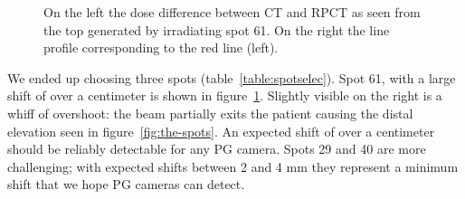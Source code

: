 \documentclass[a4paper,english]{article}
\begin{document}
\begin{figure}[htp]
  \captionsetup[subfigure]{labelformat=empty}
  \centering
  \quad\quad\quad
  \caption{On the left the dose difference between CT and RPCT as seen from the top generated by irradiating spot 61. On the right the line profile corresponding to the red line (left).}
  \label{fig:spot61}
\end{figure}

We ended up choosing three spots (table~\ref{table:spotselec}). Spot 61, with a large shift of over a centimeter is shown in figure~\ref{fig:spot61}. Slightly visible on the right is a whiff of overshoot: the beam partially exits the patient causing the distal elevation seen in figure~\ref{fig:the-spots}. An expected shift of over a centimeter should be reliably detectable for any PG camera. Spots 29 and 40 are more challenging; with expected shifts between 2 and 4 mm they represent a minimum shift that we hope PG cameras can detect.
\end{document}
